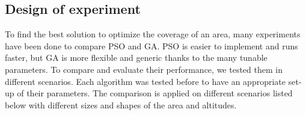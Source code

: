 
\subsection{Design of experiment }\label{sec:DoE}


To find the best solution to optimize the coverage of an area, many experiments have been done to compare PSO and GA. PSO is easier to implement and runs faster, but GA is more flexible and generic thanks to the many tunable parameters. 
To compare and evaluate their performance, we tested them in different scenarios. Each algorithm was tested before to have an appropriate set-up of their parameters. 
The comparison is applied on different scenarios %
 listed below with different sizes and shapes of the area and altitudes. 




